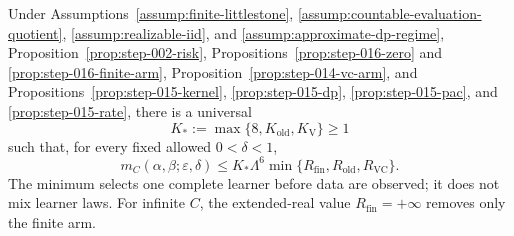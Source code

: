 \begin{proposition}\label{prop:step-016-minimum}
Under Assumptions~\ref{assump:finite-littlestone},
\ref{assump:countable-evaluation-quotient},
\ref{assump:realizable-iid}, and
\ref{assump:approximate-dp-regime},
Proposition~\ref{prop:step-002-risk},
Propositions~\ref{prop:step-016-zero} and
\ref{prop:step-016-finite-arm}, Proposition~\ref{prop:step-014-vc-arm}, and 
Propositions~\ref{prop:step-015-kernel},
\ref{prop:step-015-dp}, \ref{prop:step-015-pac}, and
\ref{prop:step-015-rate}, there is a universal
\[
K_*:=\max\{8,K_{\mathrm{old}},K_{\mathrm V}\}\ge1
\tag{6.1}
\]
such that, for every fixed allowed \(0<\delta<1\),
\[
m_C(\alpha,\beta;\varepsilon,\delta)
\le K_*\Lambda^6
\min\{R_{\mathrm{fin}},R_{\mathrm{old}},R_{\mathrm{VC}}\}.
\tag{6.2}
\]
The minimum selects one complete learner before data are observed; it does
not mix learner laws. For infinite \(C\), the extended-real value
\(R_{\mathrm{fin}}=+\infty\) removes only the finite arm.


\end{proposition}

